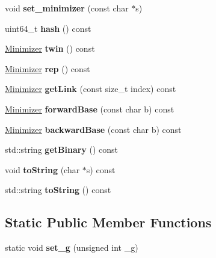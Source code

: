 \begin{DoxyCompactItemize}
void {\bfseries set\+\_\+minimizer} (const char $\ast$s)
\item 
\mbox{\label{classMinimizer_af8f4b1a389fd9a3dfaffa340d0c1c670}} 
uint64\+\_\+t {\bfseries hash} () const
\item 
\mbox{\label{classMinimizer_a403cc33952357c605b4852e893cdd7f0}} 
\hyperlink{classMinimizer}{Minimizer} {\bfseries twin} () const
\item 
\mbox{\label{classMinimizer_a34a310fc0751b437f6df7b31f81500f0}} 
\hyperlink{classMinimizer}{Minimizer} {\bfseries rep} () const
\item 
\mbox{\label{classMinimizer_a17010a423ff4d88bf860ae3e4fdaa845}} 
\hyperlink{classMinimizer}{Minimizer} {\bfseries get\+Link} (const size\+\_\+t index) const
\item 
\mbox{\label{classMinimizer_ad45e3101a565d5f171cd46ac5869dcd7}} 
\hyperlink{classMinimizer}{Minimizer} {\bfseries forward\+Base} (const char b) const
\item 
\mbox{\label{classMinimizer_a326f5c127a66a6b6319e9d7fa19c4d7a}} 
\hyperlink{classMinimizer}{Minimizer} {\bfseries backward\+Base} (const char b) const
\item 
\mbox{\label{classMinimizer_a325101b295e6ad3fb404d7d10543fd35}} 
std\+::string {\bfseries get\+Binary} () const
\item 
\mbox{\label{classMinimizer_ae9f2bc8cd51c11aa918a75ca81fe680f}} 
void {\bfseries to\+String} (char $\ast$s) const
\item 
\mbox{\label{classMinimizer_a31497f317259d061898d3e4ee569e243}} 
std\+::string {\bfseries to\+String} () const
\end{DoxyCompactItemize}
\subsection*{Static Public Member Functions}
\begin{DoxyCompactItemize}
\item 
\mbox{\label{classMinimizer_abc514fbf23095a087da264e32a8dad47}} 
static void {\bfseries set\+\_\+g} (unsigned int \+\_\+g)
\end{DoxyCompactItemize}
